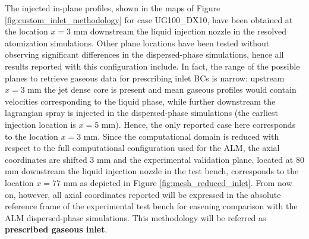 The injected in-plane profiles, shown in the maps of Figure \ref{fig:custom_inlet_methodology} for case UG100\_DX10, have been obtained at the location $x = 3$ mm downstream the liquid injection nozzle in the resolved atomization simulations. Other plane locations have been tested without observing significant differences in the dispersed-phase simulations, hence all results reported with this configuration include. In fact, the range of the possible planes to retrieve gaseous data for prescribing inlet BCs is narrow: upstream $x = 3$ mm the jet dense core is present and mean gaseous profiles would contain velocities corresponding to the liquid phase, while further downstream the lagrangian spray is injected in the dispersed-phase simulations (the earliest injection location is $x = 5$ mm). Hence, the only reported case here corresponds to the location $x = 3$ mm. Since the computational domain is reduced with respect to the full computational configuration used for the ALM, the axial coordinates are shifted 3 mm and the experimental validation plane, located at 80 mm downstream the liquid injection nozzle in the test bench, corresponds to the location $x = 77$ mm as depicted in Figure \ref{fig:mesh_reduced_inlet}. From now on, however, all axial coordinates reported will be expressed in the absolute reference frame of the experimental test bench for easening comparison with the ALM dispersed-phase simulations. This methodology will be referred as \textbf{prescribed gaseous inlet}.

